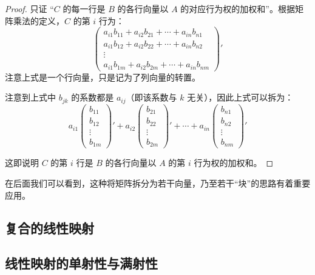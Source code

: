 \begin{proof}
	只证 “$C$ 的每一行是 $B$ 的各行向量以 $A$ 的对应行为权的加权和”。根据矩阵乘法的定义，$C$ 的第 $i$ 行为：
	$$
	\begin{pmatrix}
		a_{i1} b_{11} + a_{i2} b_{21} + \cdots + a_{in} b_{n1}
		\\
		a_{i1} b_{12} + a_{i2} b_{22} + \cdots + a_{in} b_{n2}
		\\
		\vdots
		\\
		a_{i1} b_{1m} + a_{i2} b_{2m} + \cdots + a_{in} b_{nm}
	\end{pmatrix}'
	$$
	注意上式是一个行向量，只是记为了列向量的转置。

	注意到上式中 $b_{jk}$ 的系数都是 $a_{ij}$（即该系数与 $k$ 无关），因此上式可以拆为：
	$$
	a_{i1}
	\begin{pmatrix}
		b_{11} \\ b_{12} \\ \vdots \\ b_{1m}
	\end{pmatrix}'
	+
	a_{i2}
	\begin{pmatrix}
		b_{21} \\ b_{22} \\ \vdots \\ b_{2m}
	\end{pmatrix}'
	+
	\cdots
	+
	a_{in}
	\begin{pmatrix}
		b_{n1} \\ b_{n2} \\ \vdots \\ b_{nm}
	\end{pmatrix}'
	$$

	这即说明 $C$ 的第 $i$ 行是 $B$ 的各行向量以 $A$ 的第 $i$ 行为权的加权和。
\end{proof}

在后面我们可以看到，这种将矩阵拆分为若干向量，乃至若干“块”的思路有着重要应用。

\subsection{复合的线性映射}



\subsection{线性映射的单射性与满射性}

